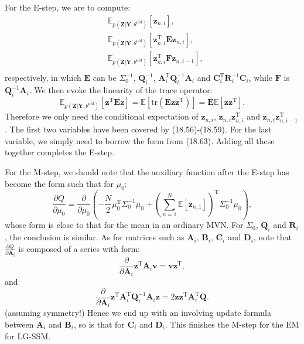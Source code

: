 \documentclass[UTF8]{ctexart}
\begin{document}
For the E-step, we are to compute:
$$
\begin{aligned}
&\mathbb{E}_{p(\textbf{Z}|\textbf{Y},\theta^{\text{old}})}\left[\textbf{z}_{n,i} \right],\\
&\mathbb{E}_{p(\textbf{Z}|\textbf{Y},\theta^{\text{old}})}\left[\textbf{z}_{n,i}^{\text{T}}\textbf{E}\textbf{z}_{n,i} \right],\\
&\mathbb{E}_{p(\textbf{Z}|\textbf{Y},\theta^{\text{old}})}\left[\textbf{z}_{n,i}^{\text{T}}\textbf{F}\textbf{z}_{n,i-1} \right],\\
\end{aligned}
$$
respectively, in which $\textbf{E}$ can be $\Sigma_{0}^{-1}$, $\textbf{Q}_{i}^{-1}$, $\textbf{A}_{i}^{\text{T}}\textbf{Q}_{i}^{-1}\textbf{A}_{i}$ and $\textbf{C}_{i}^{\text{T}}\textbf{R}_{i}^{-1}\textbf{C}_{i}$, while $\textbf{F}$ is $\textbf{Q}^{-1}_{i}\textbf{A}_{i}$. 
We then evoke the linearity of the trace operator:
$$\mathbb{E}_{p(\textbf{Z}|\textbf{Y},\theta^{\text{old}})}\left[\textbf{z}^{\text{T}}\textbf{E}\textbf{z} \right]=\mathbb{E}\left[\text{tr}(\textbf{E}\textbf{z}\textbf{z}^{\text{T}}) \right]=\textbf{E}\mathbb{E}[\textbf{z}\textbf{z}^{\text{T}}].$$
Therefore we only need the conditional expectation of $\textbf{z}_{n,i}$, $\textbf{z}_{n,i}\textbf{z}_{n,i}^{\text{T}}$ and $\textbf{z}_{n,i}\textbf{z}_{n,i-1}^{\text{T}}$. 
The first two variables have been covered by (18.56)-(18.59).
For the last variable, we simply need to borrow the form from (18.63).
Adding all these together completes the E-step.

For the M-step, we should note that the auxiliary function after the E-step has become the form such that for $\mu_{0}$:
$$\frac{\partial Q}{\partial \mu_{0}}=\frac{\partial}{\partial\mu_{0}}\left( -\frac{N}{2}\mu_{0}^{\text{T}}\Sigma^{-1}_{0}\mu_{0}+\left(\sum_{n=1}^{N}\mathbb{E}[\textbf{z}_{n,1}]\right)^{\text{T}}\Sigma_{0}^{-1}\mu_{0}\right),$$
whose form is close to that for the mean in an ordinary MVN.
For $\Sigma_{0}$, $\textbf{Q}_{i}$ and $\textbf{R}_{i}$, the conclusion is similar.
As for matrices such as $\textbf{A}_{i}$, $\textbf{B}_{i}$, $\textbf{C}_{i}$ and $\textbf{D}_{i}$, note that $\frac{\partial Q}{\partial \textbf{A}_{i}}$ is composed of a series with form:
$$\frac{\partial}{\partial\textbf{A}_{i}}\textbf{z}^{\text{T}}\textbf{A}_{i}\textbf{v}=\textbf{v}\textbf{z}^{\text{T}},$$
and
$$\frac{\partial}{\partial\textbf{A}_{i}}\textbf{z}^{\text{T}}\textbf{A}_{i}^{\text{T}}\textbf{Q}_{i}^{-1}\textbf{A}_{i}\textbf{z}=2\textbf{z}\textbf{z}^{\text{T}}\textbf{A}_{i}^{\text{T}}\textbf{Q}.$$
(assuming symmetry!)
Hence we end up with an involving update formula between $\textbf{A}_{i}$ and $\textbf{B}_{i}$, so is that for $\textbf{C}_{i}$ and $\textbf{D}_{i}$. 
This finishes the M-step for the EM for LG-SSM. 
\end{document}
